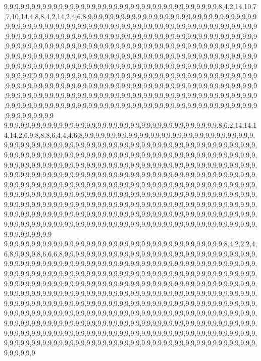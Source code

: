 9,9,9,9,9,9,9,9,9,9,9,9,9,9,9,9,9,9,9,9,9,9,9,9,9,9,9,9,9,9,9,9,9,9,9,9,9,9,9,8,4,2,14,10,7,7,10,14,4,8,8,4,2,14,2,4,6,8,9,9,9,9,9,9,9,9,9,9,9,9,9,9,9,9,9,9,9,9,9,9,9,9,9,9,9,9,9,9,9,9,9,9,9,9,9,9,9,9,9,9,9,9,9,9,9,9,9,9,9,9,9,9,9,9,9,9,9,9,9,9,9,9,9,9,9,9,9,9,9,9,9,9,9,9,9,9,9,9,9,9,9,9,9,9,9,9,9,9,9,9,9,9,9,9,9,9,9,9,9,9,9,9,9,9,9,9,9,9,9,9,9,9,9,9,9,9,9,9,9,9,9,9,9,9,9,9,9,9,9,9,9,9,9,9,9,9,9,9,9,9,9,9,9,9,9,9,9,9,9,9,9,9,9,9,9,9,9,9,9,9,9,9,9,9,9,9,9,9,9,9,9,9,9,9,9,9,9,9,9,9,9,9,9,9,9,9,9,9,9,9,9,9,9,9,9,9,9,9,9,9,9,9,9,9,9,9,9,9,9,9,9,9,9,9,9,9,9,9,9,9,9,9,9,9,9,9,9,9,9,9,9,9,9,9,9,9,9,9,9,9,9,9,9,9,9,9,9,9,9,9,9,9,9,9,9,9,9,9,9,9,9,9,9,9,9,9,9,9,9,9,9,9,9,9,9,9,9,9,9,9,9,9,9,9,9,9,9,9,9,9,9,9,9,9,9,9,9,9,9,9,9,9,9,9,9,9,9,9,9,9,9,9,9,9,9,9,9,9,9,9,9,9,9,9,9,9,9,9,9,9,9,9,9,9,9,9,9,9,9,9,9,9,9,9,9,9,9,9,9,9,9,9,9,9,9,9,9,9,9,9,9,9,9,9,9,9,9,9,9,9,9,9,9,9,9,9,9,9,9,9,9,9,9,9,9,9,9,9,9,9,9,9,9,9,9,9,9,9,9,9,9,9,9,9,9,9,9,9,9,9,9,9,9,9,9,9,9,9,9,9,9,9,9,9,9,9,9,9,9,9,9,9,9,9,9,9,9,9,9,9,9,9,9,9,9,9,9,9,9,9,9,9
9,9,9,9,9,9,9,9,9,9,9,9,9,9,9,9,9,9,9,9,9,9,9,9,9,9,9,9,9,9,9,9,9,9,9,9,9,9,9,8,6,2,14,14,14,14,2,6,9,8,8,8,6,4,4,4,6,8,9,9,9,9,9,9,9,9,9,9,9,9,9,9,9,9,9,9,9,9,9,9,9,9,9,9,9,9,9,9,9,9,9,9,9,9,9,9,9,9,9,9,9,9,9,9,9,9,9,9,9,9,9,9,9,9,9,9,9,9,9,9,9,9,9,9,9,9,9,9,9,9,9,9,9,9,9,9,9,9,9,9,9,9,9,9,9,9,9,9,9,9,9,9,9,9,9,9,9,9,9,9,9,9,9,9,9,9,9,9,9,9,9,9,9,9,9,9,9,9,9,9,9,9,9,9,9,9,9,9,9,9,9,9,9,9,9,9,9,9,9,9,9,9,9,9,9,9,9,9,9,9,9,9,9,9,9,9,9,9,9,9,9,9,9,9,9,9,9,9,9,9,9,9,9,9,9,9,9,9,9,9,9,9,9,9,9,9,9,9,9,9,9,9,9,9,9,9,9,9,9,9,9,9,9,9,9,9,9,9,9,9,9,9,9,9,9,9,9,9,9,9,9,9,9,9,9,9,9,9,9,9,9,9,9,9,9,9,9,9,9,9,9,9,9,9,9,9,9,9,9,9,9,9,9,9,9,9,9,9,9,9,9,9,9,9,9,9,9,9,9,9,9,9,9,9,9,9,9,9,9,9,9,9,9,9,9,9,9,9,9,9,9,9,9,9,9,9,9,9,9,9,9,9,9,9,9,9,9,9,9,9,9,9,9,9,9,9,9,9,9,9,9,9,9,9,9,9,9,9,9,9,9,9,9,9,9,9,9,9,9,9,9,9,9,9,9,9,9,9,9,9,9,9,9,9,9,9,9,9,9,9,9,9,9,9,9,9,9,9,9,9,9,9,9,9,9,9,9,9,9,9,9,9,9,9,9,9,9,9,9,9,9,9,9,9,9,9,9,9,9,9,9,9,9,9,9,9,9,9,9,9,9,9,9,9,9,9,9,9,9,9,9,9,9,9,9,9,9,9,9,9,9,9,9,9,9,9,9,9,9,9,9,9,9,9,9,9,9,9,9,9,9,9
9,9,9,9,9,9,9,9,9,9,9,9,9,9,9,9,9,9,9,9,9,9,9,9,9,9,9,9,9,9,9,9,9,9,9,9,9,9,9,9,8,4,2,2,2,4,6,8,9,9,9,9,8,6,6,6,8,9,9,9,9,9,9,9,9,9,9,9,9,9,9,9,9,9,9,9,9,9,9,9,9,9,9,9,9,9,9,9,9,9,9,9,9,9,9,9,9,9,9,9,9,9,9,9,9,9,9,9,9,9,9,9,9,9,9,9,9,9,9,9,9,9,9,9,9,9,9,9,9,9,9,9,9,9,9,9,9,9,9,9,9,9,9,9,9,9,9,9,9,9,9,9,9,9,9,9,9,9,9,9,9,9,9,9,9,9,9,9,9,9,9,9,9,9,9,9,9,9,9,9,9,9,9,9,9,9,9,9,9,9,9,9,9,9,9,9,9,9,9,9,9,9,9,9,9,9,9,9,9,9,9,9,9,9,9,9,9,9,9,9,9,9,9,9,9,9,9,9,9,9,9,9,9,9,9,9,9,9,9,9,9,9,9,9,9,9,9,9,9,9,9,9,9,9,9,9,9,9,9,9,9,9,9,9,9,9,9,9,9,9,9,9,9,9,9,9,9,9,9,9,9,9,9,9,9,9,9,9,9,9,9,9,9,9,9,9,9,9,9,9,9,9,9,9,9,9,9,9,9,9,9,9,9,9,9,9,9,9,9,9,9,9,9,9,9,9,9,9,9,9,9,9,9,9,9,9,9,9,9,9,9,9,9,9,9,9,9,9,9,9,9,9,9,9,9,9,9,9,9,9,9,9,9,9,9,9,9,9,9,9,9,9,9,9,9,9,9,9,9,9,9,9,9,9,9,9,9,9,9,9,9,9,9,9,9,9,9,9,9,9,9,9,9,9,9,9,9,9,9,9,9,9,9,9,9,9,9,9,9,9,9,9,9,9,9,9,9,9,9,9,9,9,9,9,9,9,9,9,9,9,9,9,9,9,9,9,9,9,9,9,9,9,9,9,9,9,9,9,9,9,9,9,9,9,9,9,9,9,9,9,9,9,9,9,9,9,9,9,9,9,9,9,9,9,9,9,9,9,9,9,9,9,9,9,9,9,9,9,9,9,9,9,9,9,9,9,9,9,9,9,9,9
